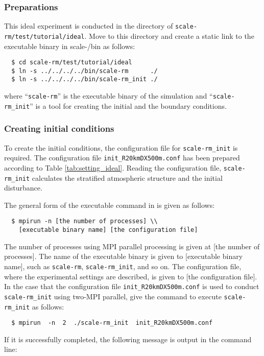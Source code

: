 \subsubsection{Preparations} %

This ideal experiment is conducted in the directory of \verb|scale-rm/test/tutorial/ideal|.  Move to this directory and  create a static link to the executable binary in scale-{\version}/bin as follows:
\begin{verbatim}
  $ cd scale-rm/test/tutorial/ideal
  $ ln -s ../../../../bin/scale-rm      ./
  $ ln -s ../../../../bin/scale-rm_init ./
\end{verbatim}
where ``\verb|scale-rm|'' is the executable binary of the simulation
and  ``\verb|scale-rm_init|'' is a tool for creating the initial and the boundary conditions.


\subsubsection{Creating initial conditions} \label{subsec:ideal_exp_init}

To create the initial conditions, the configuration file for \verb|scale-rm_init| is required.
The configuration file \verb|init_R20kmDX500m.conf| has been prepared
according to Table \ref{tab:setting_ideal}.
Reading the configuration file, \verb|scale-rm_init| calculates the stratified atmospheric structure and the initial disturbance.

The general form of the executable command in \scalerm is given as follows:
\begin{verbatim}
  $ mpirun -n [the number of processes] \\
    [executable binary name] [the configuration file]
\end{verbatim}
The number of processes using MPI parallel processing is given at [the number of processes]. The name of the executable binary is given to [executable binary name],  such as \verb|scale-rm|, \verb|scale-rm_init|, and so on.  The configuration file, where the experimental settings are described, is given to [the configuration file].
In the case that
the configuration file \verb|init_R20kmDX500m.conf| is used to conduct \verb|scale-rm_init| using two-MPI parallel, give the command to execute \verb|scale-rm_init| as follows:
\begin{verbatim}
  $ mpirun  -n  2  ./scale-rm_init  init_R20kmDX500m.conf
\end{verbatim}
\noindent
If it is successfully completed, the following message is output in the command line:

